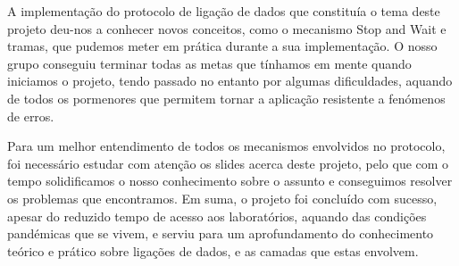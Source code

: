 \documentclass[article, a4paper, 11pt, oneside]{memoir}
\begin{document}
A implementação do protocolo de ligação de dados que constituía o tema deste projeto deu-nos a conhecer novos conceitos, como o mecanismo Stop and Wait e tramas, 
que pudemos meter em prática durante a sua implementação. O nosso grupo conseguiu terminar todas as metas que tínhamos em mente quando iniciamos o projeto,
 tendo passado no entanto por algumas dificuldades, aquando de todos os pormenores que permitem tornar a aplicação resistente a fenómenos de erros. 
 
 Para um melhor entendimento de todos os mecanismos envolvidos no protocolo, 
 foi necessário estudar com atenção os slides acerca deste projeto, pelo que com o tempo solidificamos o 
 nosso conhecimento sobre o assunto e conseguimos resolver os problemas que encontramos.
Em suma, o projeto foi concluído com sucesso, apesar do reduzido tempo de acesso aos laboratórios, aquando das condições pandémicas que se vivem, 
e serviu para um aprofundamento 
do conhecimento teórico e prático sobre ligações de dados, e as camadas que estas envolvem.
\end{document}
